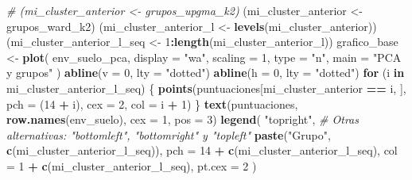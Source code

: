 \documentclass[11pt,]{article}
\newenvironment{Shaded}{\begin{snugshade}}{\end{snugshade}}
\newcommand{\KeywordTok}[1]{\textcolor[rgb]{0.13,0.29,0.53}{\textbf{#1}}}
\newcommand{\DataTypeTok}[1]{\textcolor[rgb]{0.13,0.29,0.53}{#1}}
\newcommand{\DecValTok}[1]{\textcolor[rgb]{0.00,0.00,0.81}{#1}}
\newcommand{\StringTok}[1]{\textcolor[rgb]{0.31,0.60,0.02}{#1}}
\newcommand{\CommentTok}[1]{\textcolor[rgb]{0.56,0.35,0.01}{\textit{#1}}}
\newcommand{\ControlFlowTok}[1]{\textcolor[rgb]{0.13,0.29,0.53}{\textbf{#1}}}
\newcommand{\OperatorTok}[1]{\textcolor[rgb]{0.81,0.36,0.00}{\textbf{#1}}}
\newcommand{\NormalTok}[1]{#1}
\begin{document}
\begin{Shaded}
\begin{Highlighting}[]
{{{{{\CommentTok{# (mi_cluster_anterior <- grupos_upgma_k2)}
\NormalTok{(mi_cluster_anterior <-}\StringTok{ }\NormalTok{grupos_ward_k2)}
\NormalTok{(mi_cluster_anterior_l <-}\StringTok{ }\KeywordTok{levels}\NormalTok{(mi_cluster_anterior))}
\NormalTok{(mi_cluster_anterior_l_seq <-}\StringTok{ }\DecValTok{1}\OperatorTok{:}\KeywordTok{length}\NormalTok{(mi_cluster_anterior_l))}
\NormalTok{grafico_base <-}\StringTok{ }\KeywordTok{plot}\NormalTok{(}
\NormalTok{  env_suelo_pca,}
  \DataTypeTok{display =} \StringTok{"wa"}\NormalTok{,}
  \DataTypeTok{scaling =} \DecValTok{1}\NormalTok{,}
  \DataTypeTok{type =} \StringTok{"n"}\NormalTok{,}
  \DataTypeTok{main =} \StringTok{"PCA y grupos"}
\NormalTok{)}
\KeywordTok{abline}\NormalTok{(}\DataTypeTok{v =} \DecValTok{0}\NormalTok{, }\DataTypeTok{lty =} \StringTok{"dotted"}\NormalTok{)}
\KeywordTok{abline}\NormalTok{(}\DataTypeTok{h =} \DecValTok{0}\NormalTok{, }\DataTypeTok{lty =} \StringTok{"dotted"}\NormalTok{)}
\ControlFlowTok{for}\NormalTok{ (i }\ControlFlowTok{in}\NormalTok{ mi_cluster_anterior_l_seq) \{}
  \KeywordTok{points}\NormalTok{(puntuaciones[mi_cluster_anterior }\OperatorTok{==}\StringTok{ }\NormalTok{i, ],}
         \DataTypeTok{pch =}\NormalTok{ (}\DecValTok{14} \OperatorTok{+}\StringTok{ }\NormalTok{i),}
         \DataTypeTok{cex =} \DecValTok{2}\NormalTok{,}
         \DataTypeTok{col =}\NormalTok{ i }\OperatorTok{+}\StringTok{ }\DecValTok{1}\NormalTok{)}
\NormalTok{\}}
\KeywordTok{text}\NormalTok{(puntuaciones, }\KeywordTok{row.names}\NormalTok{(env_suelo), }\DataTypeTok{cex =} \DecValTok{1}\NormalTok{, }\DataTypeTok{pos =} \DecValTok{3}\NormalTok{)}
\KeywordTok{legend}\NormalTok{(}
  \StringTok{"topright"}\NormalTok{, }\CommentTok{# Otras alternativas: "bottomleft", "bottomright" y "topleft"}
  \KeywordTok{paste}\NormalTok{(}\StringTok{"Grupo"}\NormalTok{, }\KeywordTok{c}\NormalTok{(mi_cluster_anterior_l_seq)),}
  \DataTypeTok{pch =} \DecValTok{14} \OperatorTok{+}\StringTok{ }\KeywordTok{c}\NormalTok{(mi_cluster_anterior_l_seq),}
  \DataTypeTok{col =} \DecValTok{1} \OperatorTok{+}\StringTok{ }\KeywordTok{c}\NormalTok{(mi_cluster_anterior_l_seq),}
  \DataTypeTok{pt.cex =} \DecValTok{2}
\NormalTok{)}
 
}}}}}
\end{Highlighting}
\end{Shaded}
\end{document}
